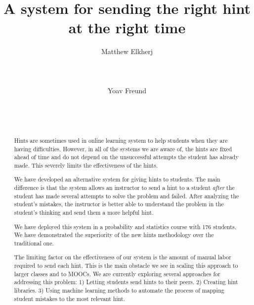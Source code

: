 \documentclass{sigchi}
\begin{document}
\title{A system for sending the right hint at the right time}

\author{
  \alignauthor Matthew Elkherj\\
    \\
    \\
    \\
  \alignauthor Yoav Freund\\
    \\
    \\
    \\
}

\maketitle

\begin{abstract}
Hints are sometimes used in online learning system to help students
when they are having difficulties. However, in all of the systems we
are aware of, the hints are fixed ahead of time and do not depend on
the unsuccessful attempts the student has already made. This severely
limits the effectiveness of the hints.

We have developed an alternative system for giving hints to
students. The main difference is that the system allows an instructor
to send a hint to a student {\em after} the student has
made several attempts to solve the problem and failed.  After
analyzing the student's mistakes, the instructor is better able to
understand the problem in the student's thinking and send them a more
helpful hint.

We have deployed this system in a probability and statistics course
with 176 students. We have demonstrated the superiority of the new
hints methodology over the traditional one.

The limiting factor on the effectiveness of our system is the amount
of manual labor required to send each hint. This is the main obstacle
we see in scaling this approach to larger classes and to MOOCs. We
are currently exploring several approaches for addressing this
problem: 1) Letting students send hints to their peers. 2) Creating
hint libraries. 3) Using machine learning methods to automate
the process of mapping student mistakes to the most relevant hint.

\end{abstract}
\end{document}
